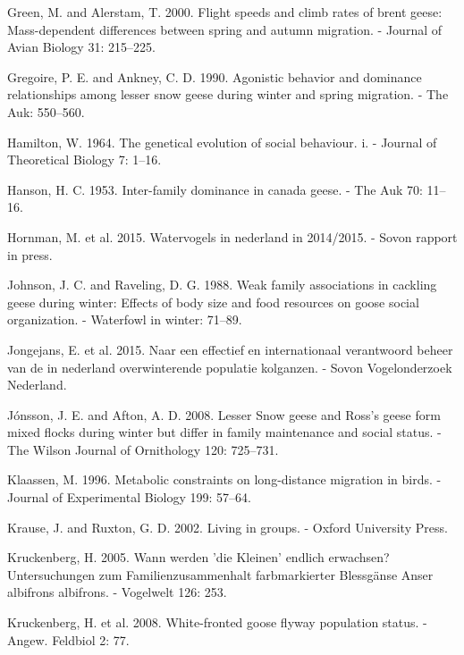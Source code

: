 \documentclass[10pt,twocolumn]{paper}
\begin{document}
\hypertarget{ref-JAV:JAV310213}{}
Green, M. and Alerstam, T. 2000. Flight speeds and climb rates of brent
geese: Mass-dependent differences between spring and autumn migration. -
Journal of Avian Biology 31: 215--225.

\hypertarget{ref-gregoire1990agonistic}{}
Gregoire, P. E. and Ankney, C. D. 1990. Agonistic behavior and dominance
relationships among lesser snow geese during winter and spring
migration. - The Auk: 550--560.

\hypertarget{ref-HAMILTON19641}{}
Hamilton, W. 1964. The genetical evolution of social behaviour. i. -
Journal of Theoretical Biology 7: 1--16.

\hypertarget{ref-hanson1953dominance}{}
Hanson, H. C. 1953. Inter-family dominance in canada geese. - The Auk
70: 11--16.

\hypertarget{ref-sovon2015watervogels}{}
Hornman, M. et al. 2015. Watervogels in nederland in 2014/2015. - Sovon
rapport in press.

\hypertarget{ref-johnson1988weak}{}
Johnson, J. C. and Raveling, D. G. 1988. Weak family associations in
cackling geese during winter: Effects of body size and food resources on
goose social organization. - Waterfowl in winter: 71--89.

\hypertarget{ref-jongejans2015naar}{}
Jongejans, E. et al. 2015. Naar een effectief en internationaal
verantwoord beheer van de in nederland overwinterende populatie
kolganzen. - Sovon Vogelonderzoek Nederland.

\hypertarget{ref-jonsson2008lesser}{}
Jónsson, J. E. and Afton, A. D. 2008. Lesser Snow geese and Ross's geese
form mixed flocks during winter but differ in family maintenance and
social status. - The Wilson Journal of Ornithology 120: 725--731.

\hypertarget{ref-Klaassen57}{}
Klaassen, M. 1996. Metabolic constraints on long-distance migration in
birds. - Journal of Experimental Biology 199: 57--64.

\hypertarget{ref-krause2002living}{}
Krause, J. and Ruxton, G. D. 2002. Living in groups. - Oxford University
Press.

\hypertarget{ref-kruckenberg2005young}{}
Kruckenberg, H. 2005. Wann werden 'die Kleinen' endlich erwachsen?
Untersuchungen zum Familienzusammenhalt farbmarkierter Blessgänse Anser
albifrons albifrons. - Vogelwelt 126: 253.

\hypertarget{ref-kruckenberg2008white}{}
Kruckenberg, H. et al. 2008. White-fronted goose flyway population
status. - Angew. Feldbiol 2: 77.
\end{document}
